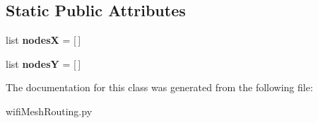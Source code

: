 \subsection*{Static Public Attributes}
\begin{DoxyCompactItemize}
\item 
\hypertarget{classmininet_1_1wifiMeshRouting_1_1listNodes_a8acf8072108660d1e9799fda94b489e3}{list {\bfseries nodes\-X} = \mbox{[}$\,$\mbox{]}}\label{classmininet_1_1wifiMeshRouting_1_1listNodes_a8acf8072108660d1e9799fda94b489e3}

\item 
\hypertarget{classmininet_1_1wifiMeshRouting_1_1listNodes_ab9232ee808764f6250ded923fd7026b4}{list {\bfseries nodes\-Y} = \mbox{[}$\,$\mbox{]}}\label{classmininet_1_1wifiMeshRouting_1_1listNodes_ab9232ee808764f6250ded923fd7026b4}

\end{DoxyCompactItemize}


The documentation for this class was generated from the following file\-:\begin{DoxyCompactItemize}
\item 
wifi\-Mesh\-Routing.\-py\end{DoxyCompactItemize}
